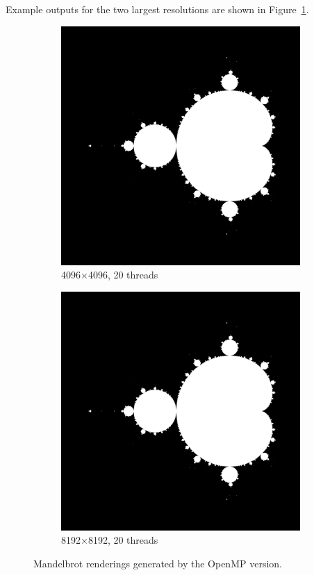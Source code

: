 Example outputs for the two largest resolutions are shown in Figure~\ref{fig:mandel_images}.
\begin{figure}[H]
    \centering
    \begin{subfigure}{0.45\linewidth}
        \includegraphics[width=\linewidth]{../Skeleton_codes/mandel/png/mandel_4096x4096_T20.png}
        \caption{4096×4096, 20 threads}
    \end{subfigure}
    \hfill
    \begin{subfigure}{0.45\linewidth}
        \includegraphics[width=\linewidth]{../Skeleton_codes/mandel/png/mandel_8192x8192_T20.png}
        \caption{8192×8192, 20 threads}
    \end{subfigure}
    \caption{Mandelbrot renderings generated by the OpenMP version.}
    \label{fig:mandel_images}
\end{figure}

